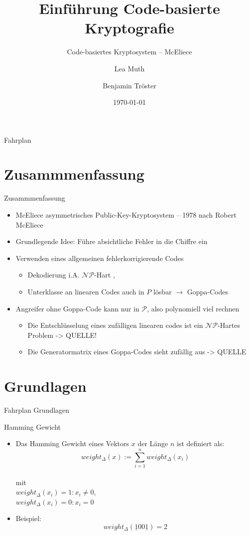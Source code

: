 \documentclass[11pt%
,aspectratio=169%
]{beamer}
\author{Lea Muth \and Benjamin Tröster}
\title[Code-basierte Kryptografie]{Einführung Code-basierte Kryptografie}
\subtitle{Code-basiertes Kryptosystem -- McEliece}
\date{\today}
\institute[FU Berlin]{Freie Universität Berlin}
\begin{document}
\begin{frame}
\titlepage
\end{frame}

\begin{frame}{Fahrplan}
\tableofcontents[hideothersubsections]
\end{frame}

\section*{Zusammmenfassung}
\begin{frame}{Zusammmenfassung}
	\begin{itemize}
		\item McEliece asymmetrisches Public-Key-Kryptosystem -- 1978 nach Robert McEliece \cite{McEliece1978public}
		\item Grundlegende Idee: Führe absichtliche Fehler in die Chiffre ein 
		\item Verwenden eines allgemeinen fehlerkorrigierende Codes
		\begin{itemize}
		    \item Dekodierung i.A. $\mathcal{NP}$-Hart \cite[S. 479]{Schneier2007Applied}, \cite[S. 353ff]{Stinson2018Cryptography}
		    \item Unterklasse an linearen Codes auch in $P$ lösbar $\rightarrow$ Goppa-Codes
		\end{itemize}
		\item Angreifer ohne Goppa-Code kann nur in $\mathcal{P}$, also polynomiell viel rechnen
		\begin{itemize}
		    \item Die Entschlüsselung eines zufälligen linearen codes ist ein $\mathcal{NP}$-Hartes Problem -> QUELLE!
		    \item Die Generatormatrix eines Goppa-Codes sieht zufällig aus -> QUELLE
		\end{itemize}
	\end{itemize}
\end{frame}

\section{Grundlagen}

\begin{frame}{Fahrplan Grundlagen}
\end{frame}

\begin{frame}{Hamming Gewicht}
	\begin{itemize}
		\item Das Hamming Gewicht eines Vektors $x$ der Länge $n$ ist definiert als:
		       \[ weight_{\Delta}(x):= \sum_{i=1}^n weight_{\Delta}(x_i)  \]
		       \\mit\\ $weight_{\Delta}(x_i) = 1: x_i \neq 0$, \\$weight_{\Delta}(x_i) =0 : x_i = 0$ 
     	\item Beispiel:
					$$
					weight_{\Delta}(\underline{1}00\underline{1})  = 2
					$$
	\end{itemize}
\end{frame}
\end{document}
